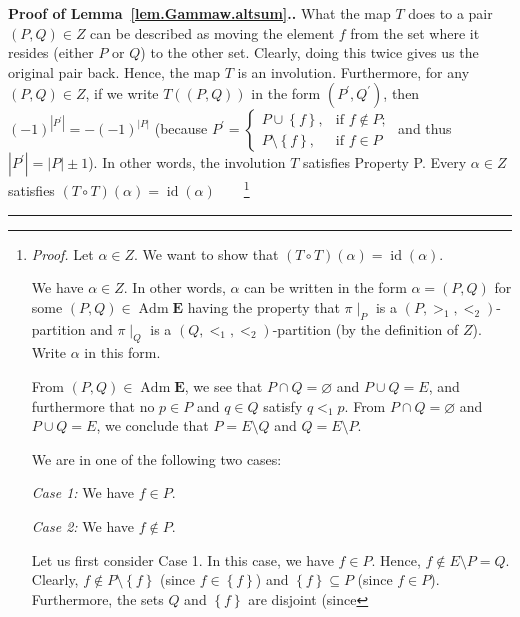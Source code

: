 \documentclass[numbers=enddot,12pt,final,onecolumn,notitlepage,abstracton]{scrartcl}
\theoremstyle{definition}
\newenvironment{proof}[1][Proof]{\noindent\textbf{#1.} }{\ \rule{0.5em}{0.5em}}
\newenvironment{verlong}{}{}
\newenvironment{vershort}{}{}
\newcommand{\id}{{\operatorname{id}}}
\newcommand{\Adm}{\operatorname{Adm}}
\newcommand{\EE}{{\mathbf{E}}}
\begin{document}
\begin{proof}[Proof of Lemma~\ref{lem.Gammaw.altsum}.]
\begin{vershort}
What the map $T$ does to a pair $\left(  P,Q\right)  \in Z$ can be described
as moving the element $f$ from the set where it resides (either $P$ or $Q$) to
the other set. Clearly, doing this twice gives us the original pair back.
Hence, the map $T$ is an involution. Furthermore, for any $\left(  P,Q\right)
\in Z$, if we write $T\left(  \left(  P,Q\right)  \right)  $ in the form
$\left(  P^{\prime},Q^{\prime}\right)  $, then $\left(  -1\right)
^{\left\vert P^{\prime}\right\vert }=-\left(  -1\right)  ^{\left\vert
P\right\vert }$ (because $P^{\prime}=
\begin{cases}
P\cup\left\{  f\right\}  , & \text{if }f\notin P;\\
P\setminus\left\{  f\right\}  , & \text{if }f\in P
\end{cases}
$ and thus
$\left|P^\prime\right| = \left|P\right| \pm 1$).
In other words, the involution $T$ satisfies Property P.
\end{vershort}
\begin{verlong}
Every $\alpha\in Z$ satisfies $\left(  T\circ T\right)  \left(  \alpha\right)
=\id\left(  \alpha\right)  $\ \ \ \ \footnote{\textit{Proof.}
Let $\alpha\in Z$. We want to show that $\left(  T\circ T\right)  \left(
\alpha\right)  = \id \left(  \alpha\right)  $.
\par
We have $\alpha\in Z$. In other words, $\alpha$ can be written in the form
$\alpha=\left(  P,Q\right)  $ for some $\left(  P,Q\right)  \in
\Adm \EE $ having the property that $\pi\mid_{P}$ is a
$\left(  P,>_{1},<_{2}\right)  $-partition and $\pi\mid_{Q}$ is a $\left(
Q,<_{1},<_{2}\right)  $-partition (by the definition of $Z$). Write $\alpha$
in this form.
\par
From $\left(  P,Q\right)  \in \Adm \EE $, we see that
$P\cap Q=\varnothing$ and $P\cup Q=E$, and furthermore that no $p\in P$ and
$q\in Q$ satisfy $q<_{1}p$. From $P\cap Q=\varnothing$ and $P\cup Q=E$, we
conclude that $P=E\setminus Q$ and $Q=E\setminus P$.
\par
We are in one of the following two cases:
\par
\textit{Case 1:} We have $f\in P$.
\par
\textit{Case 2:} We have $f\notin P$.
\par
Let us first consider Case 1. In this case, we have $f\in P$. Hence, $f\notin
E\setminus P=Q$. Clearly, $f\notin P\setminus\left\{  f\right\}  $ (since
$f\in\left\{  f\right\}  $) and $\left\{  f\right\}  \subseteq P$ (since $f\in
P$). Furthermore, the sets $Q$ and $\left\{  f\right\}  $ are disjoint (since
}
\end{verlong}
\end{proof}
\end{document}
